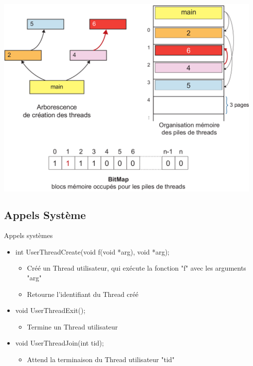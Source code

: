 \documentclass{beamer}
\begin{document}
\begin{frame}
  	\begin{center}
	  	\includegraphics[scale=0.25]{images/FS5.png}
  	\end{center}
\end{frame}


\subsection{Appels Système}
\begin{frame}
	\begin{block}{Appels systèmes}
		\begin{itemize}
			\item<1-> int UserThreadCreate(void f(void *arg), void *arg);
			\begin{itemize}
				\item<1-> Créé un Thread utilisateur, qui exécute la fonction "f" avec les arguments "arg"
				\item<1-> Retourne l'identifiant du Thread créé
			\end{itemize}
			\item<2-> void UserThreadExit();
			\begin{itemize}
				\item<1-> Termine un Thread utilisateur
			\end{itemize}
			\item<3-> void UserThreadJoin(int tid);
			\begin{itemize}
				\item<1-> Attend la terminaison du Thread utilisateur "tid"
			\end{itemize}
		\end{itemize}
	\end{block}
\end{frame}
\end{document}
